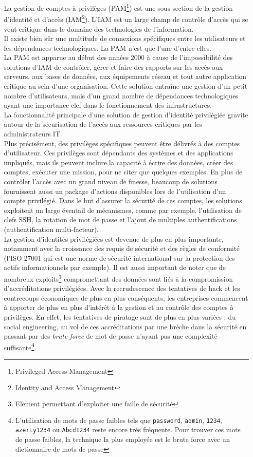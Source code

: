La gestion de comptes à privilèges (PAM\footnote{Privileged Access Management}) est une sous-section de la gestion d’identité et d’accès (IAM\footnote{Identity and Access Management}). L’IAM est un large champ de contrôle d’accès qui se veut critique dans le domaine des technologies de l’information.\\
Il existe bien sûr une multitude de connexions spécifiques entre les utilisateurs et les dépendances technologiques. La PAM n’est que l’une d’entre elles.\\
La PAM est apparue au début des années 2000 à cause de l’impossibilité des solutions d’IAM de contrôler, gérer et faire des rapports sur les accès aux serveurs, aux bases de données, aux équipements réseau et tout autre application critique au sein d’une organisation. Cette solution entraîne une gestion d’un petit nombre d’utilisateurs, mais d’un grand nombre de dépendances technologiques ayant une importance clef dans le fonctionnement des infrastructures.\\
La fonctionnalité principale d’une solution de gestion d’identité privilégiée gravite autour de la sécurisation de l’accès aux ressources critiques par les administrateurs IT.\\
Plus précisément, des privilèges spécifiques peuvent être délivrés à des comptes d’utilisateur. Ces privilèges sont dépendants des systèmes et des applications impliqués, mais ils peuvent inclure la capacité à écrire des données, créer des comptes, exécuter une mission, pour ne citer que quelques exemples. En plus de contrôler l’accès avec un grand niveau de finesse, beaucoup de solutions fournissent aussi un package d’actions disponibles lors de l’utilisation d’un compte privilégié. Dans le but d’assurer la sécurité de ces comptes, les solutions exploitent un large éventail de mécanismes, comme par exemple, l’utilisation de clefs SSH, la rotation de mot de passe et l’ajout de multiples authentifications (authentification multi-facteur).\\
La gestion d’identités privilégiées est devenue de plus en plus importante, notamment avec la croissance des requis de sécurité et des règles de conformité (l’ISO 27001 qui est une norme de sécurité international sur la protection des actifs informationnels par exemple). Il est aussi important de noter que de nombreux exploits\footnote{Element permettant d'exploiter une faille de sécurité} compromettant des données sont liés à la compromission d’accréditations privilégiées. Avec la recrudescence des tentatives de hack et les contrecoups économiques de plus en plus conséquents, les entreprises commencent à apporter de plus en plus d’intérêt à la gestion et au contrôle des comptes à privilèges. En effet, les tentatives de piratage sont de plus en plus variées : du social engineering, au vol de ces accréditations par une brèche dans la sécurité en passant par des \textit{brute force} de mot de passe n’ayant pas une complexité suffisante\footnote{L'utilisation de mots de passe faibles tels que \texttt{password}, \texttt{admin}, \texttt{1234}, \texttt{azerty1234} ou \texttt{Abcd1234} reste encore très fréquente. Pour trouver ces mots de passe faibles, la technique la plus employée est le brute force avec un dictionnaire de mots de passe}.\\

